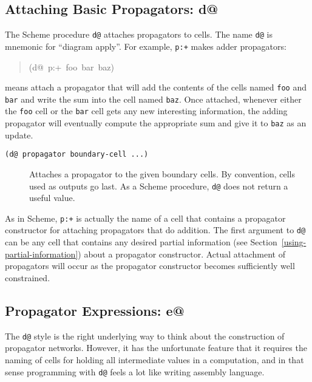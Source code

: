 \documentclass[12pt,letterpaper,english]{article}
\begin{document}
\subsection{Attaching Basic Propagators: d@}
\label{attaching-basic-propagators-d}

The Scheme procedure \texttt{d@} attaches propagators to cells.  The
name \texttt{d@} is mnemonic for ``diagram apply''.  For
example, \texttt{p:+} makes adder propagators:
\begin{quote}{\ttfamily \raggedright \noindent
(d@~p:+~foo~bar~baz)
}\end{quote}
means attach a propagator that will add the contents of the cells
named \texttt{foo} and \texttt{bar} and write the sum into the cell named \texttt{baz}.
Once attached, whenever either the \texttt{foo} cell or the \texttt{bar} cell
gets any new interesting information, the adding propagator will
eventually compute the appropriate sum and give it to \texttt{baz} as an
update.
\begin{description}
\item[{\texttt{(d@ propagator boundary-cell ...)}}] \leavevmode 
Attaches a propagator to the given boundary cells.  By convention,
cells used as outputs go last.  As a Scheme procedure, \texttt{d@} does
not return a useful value.

\end{description}

As in Scheme, \texttt{p:+} is actually the name of a cell that contains a
propagator constructor for attaching propagators that do addition.
The first argument to \texttt{d@} can be any cell that contains any desired
partial information (see Section~\ref{using-partial-information})
about a propagator constructor.
Actual attachment of propagators will occur as the propagator
constructor becomes sufficiently well constrained.



\subsection{Propagator Expressions: e@}
\label{propagator-expressions-e}

The \texttt{d@} style is the right underlying way to think about the
construction of propagator networks.  However, it has the unfortunate
feature that it requires the naming of cells for holding all
intermediate values in a computation, and in that sense programming
with \texttt{d@} feels a lot like writing assembly language.
\end{document}
